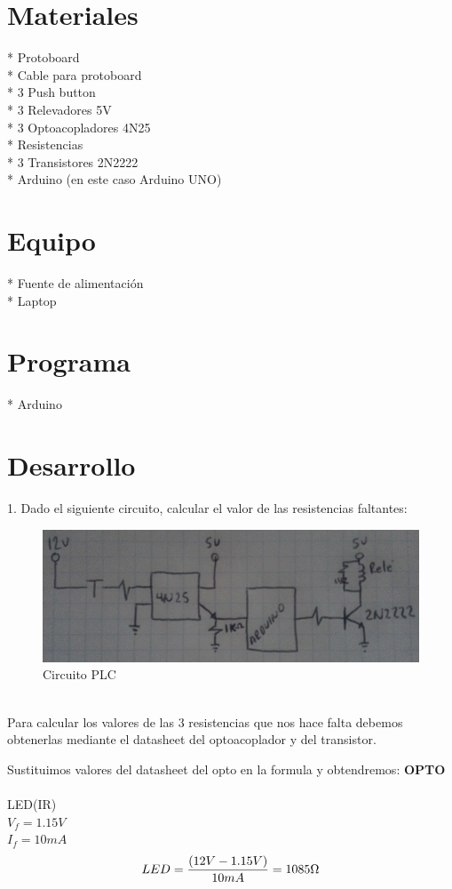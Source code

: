 \documentclass[12pt,a4paper]{article}
\begin{document}
\newpage
\section*{Materiales}
* Protoboard\\
* Cable para protoboard\\
* 3 Push button\\
* 3 Relevadores 5V\\
* 3 Optoacopladores 4N25\\
* Resistencias \\
* 3 Transistores 2N2222\\
* Arduino (en este caso Arduino UNO)

\section*{Equipo}
* Fuente de alimentación \\
* Laptop 

\section*{Programa}
* Arduino 

\newpage
\section{Desarrollo}
1. Dado el siguiente circuito, calcular el valor de las resistencias faltantes: 
\begin{figure}[hbtp]
\centering
\includegraphics[scale=0.7]{Circuito/Circuito1.PNG}
\caption{Circuito PLC}
\end{figure}\\
Para calcular los valores de las 3 resistencias que nos hace falta debemos obtenerlas mediante el datasheet del optoacoplador y del transistor.

Sustituimos valores del datasheet del opto en la formula y obtendremos: 
\textbf{OPTO}\\
\\
LED(IR)\\
$V_f=1.15V$\\
$I_f=10mA$\\
\begin{equation}
LED=\frac{(12V-1.15V)}{10mA}=1085\Omega\\
\end{equation}
\end{document}
